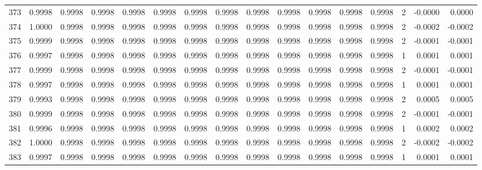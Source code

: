\begin{tabular}{lrrrrrrrrrrrrrrr}
373 &      0.9998 &  0.9998 &  0.9998 &  0.9998 &  0.9998 &  0.9998 &  0.9998 &  0.9998 &  0.9998 &  0.9998 &   0.9998 &     0.9998 &      2 &                   -0.0000 &                     0.0000 \\
374 &      1.0000 &  0.9998 &  0.9998 &  0.9998 &  0.9998 &  0.9998 &  0.9998 &  0.9998 &  0.9998 &  0.9998 &   0.9998 &     0.9998 &      2 &                   -0.0002 &                    -0.0002 \\
375 &      0.9999 &  0.9998 &  0.9998 &  0.9998 &  0.9998 &  0.9998 &  0.9998 &  0.9998 &  0.9998 &  0.9998 &   0.9998 &     0.9998 &      2 &                   -0.0001 &                    -0.0001 \\
376 &      0.9997 &  0.9998 &  0.9998 &  0.9998 &  0.9998 &  0.9998 &  0.9998 &  0.9998 &  0.9998 &  0.9998 &   0.9998 &     0.9998 &      1 &                    0.0001 &                     0.0001 \\
377 &      0.9999 &  0.9998 &  0.9998 &  0.9998 &  0.9998 &  0.9998 &  0.9998 &  0.9998 &  0.9998 &  0.9998 &   0.9998 &     0.9998 &      2 &                   -0.0001 &                    -0.0001 \\
378 &      0.9997 &  0.9998 &  0.9998 &  0.9998 &  0.9998 &  0.9998 &  0.9998 &  0.9998 &  0.9998 &  0.9998 &   0.9998 &     0.9998 &      1 &                    0.0001 &                     0.0001 \\
379 &      0.9993 &  0.9998 &  0.9998 &  0.9998 &  0.9998 &  0.9998 &  0.9998 &  0.9998 &  0.9998 &  0.9998 &   0.9998 &     0.9998 &      2 &                    0.0005 &                     0.0005 \\
380 &      0.9999 &  0.9998 &  0.9998 &  0.9998 &  0.9998 &  0.9998 &  0.9998 &  0.9998 &  0.9998 &  0.9998 &   0.9998 &     0.9998 &      2 &                   -0.0001 &                    -0.0001 \\
381 &      0.9996 &  0.9998 &  0.9998 &  0.9998 &  0.9998 &  0.9998 &  0.9998 &  0.9998 &  0.9998 &  0.9998 &   0.9998 &     0.9998 &      1 &                    0.0002 &                     0.0002 \\
382 &      1.0000 &  0.9998 &  0.9998 &  0.9998 &  0.9998 &  0.9998 &  0.9998 &  0.9998 &  0.9998 &  0.9998 &   0.9998 &     0.9998 &      2 &                   -0.0002 &                    -0.0002 \\
383 &      0.9997 &  0.9998 &  0.9998 &  0.9998 &  0.9998 &  0.9998 &  0.9998 &  0.9998 &  0.9998 &  0.9998 &   0.9998 &     0.9998 &      1 &                    0.0001 &                     0.0001 \\

\end{tabular}
